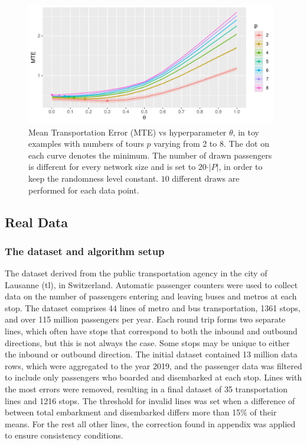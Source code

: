 \documentclass{bmcart}
\begin{document}
\begin{figure}[h]
	\includegraphics[width=0.98\textwidth]{fig/MTE_tours.pdf}
	\caption{Mean Transportation Error (MTE) vs hyperparameter $\theta$, in toy examples with numbers of tours $p$ varying from 2 to 8. The dot on each curve denotes the minimum. The number of drawn passengers is different for every network size and is set to $20 \cdot \vert P \vert$, in order to keep the randomness level constant. $10$ different draws are performed for each data point.}
	\label{MTE_vs_theta}
\end{figure}

\subsection{Real Data}
\label{real_data}

\subsubsection{The dataset and algorithm setup}
\label{data_algo}
The dataset derived from the public transportation agency in the city of Lausanne (tl), in Switzerland. Automatic passenger counters were used to collect data on the number of passengers entering and leaving buses and metros at each stop. The dataset comprises 44 lines of metro and bus transportation, 1361 stops, and over 115 million passengers per year. Each round trip forms two separate lines, which often have stops that correspond to both the inbound and outbound directions, but this is not always the case. Some stops may be unique to either the inbound or outbound direction. The initial dataset contained 13 million data rows, which were aggregated to the year 2019, and the passenger data was filtered to include only passengers who boarded and disembarked at each stop. Lines with the most errors were removed, resulting in a final dataset of 35 transportation lines and 1216 stops. The threshold for invalid lines was set when a difference of between total embarkment and disembarked differs more than 15\% of their means. For the rest all other lines, the correction found in appendix was applied to ensure consistency conditions.  
\end{document}
